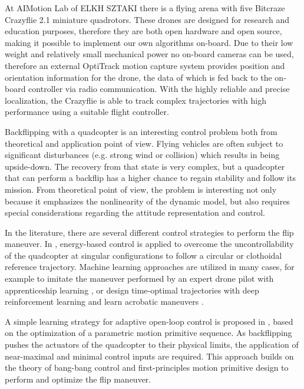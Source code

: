 At AIMotion Lab of ELKH SZTAKI there is a flying arena with five Bitcraze Crazyflie 2.1 miniature quadrotors. These drones are designed for research and education purposes, therefore they are both open hardware and open source, making it possible to implement our own algorithms on-board. Due to their low weight and relatively small mechanical power no on-board cameras can be used, therefore an external OptiTrack motion capture system provides position and orientation information for the drone, the data of which is fed back to the on-board controller via radio communication. With the highly reliable and precise localization, the Crazyflie is able to track complex trajectories with high performance using a suitable flight controller.

Backflipping with a quadcopter is an interesting control problem both from theoretical and application point of view. Flying vehicles are often subject to significant disturbances (e.g. strong wind or collision) which results in being upside-down. The recovery from that state is very complex, but a quadcopter that can perform a backflip has a higher chance to regain stability and follow its mission. From theoretical point of view, the problem is interesting not only because it emphasizes the nonlinearity of the dynamic model, but also requires special considerations regarding the attitude representation and control. 

In the literature, there are several different control strategies to perform the flip maneuver. In \cite{energy-quaternion}, energy-based control is applied to overcome the uncontrollability of the quadcopter at singular configurations to follow a circular or clothoidal reference trajectory. Machine learning approaches are utilized in many cases, for example to imitate the maneuver performed by an expert drone pilot with apprenticeship learning \cite{abbeel2010}, or design time-optimal trajectories with deep reinforcement learning \cite{drone-racing-deep-rl} and learn acrobatic maneuvers \cite{deep_acrobatics, quadrotor-control-rl}. 

A simple learning strategy for adaptive open-loop control is proposed in \cite{LSICRA2010}, based on the optimization of a parametric motion primitive sequence. As backflipping pushes the actuators of the quadcopter to their physical limits, the application of near-maximal and minimal control inputs are required. This approach builds on the theory of bang-bang control and first-principles motion primitive design to perform and optimize the flip maneuver. 

